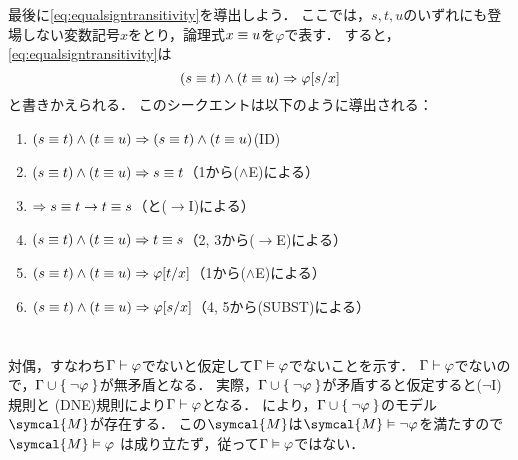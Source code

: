 最後に\cref{eq:equalsigntransitivity}を導出しよう．
ここでは，\(s, t, u\)のいずれにも登場しない変数記号\(x\)をとり，論理式\(x \equiv u\)を\(\varphi\)で表す．
すると，\cref{eq:equalsigntransitivity}は
\begin{equation*}
	\paren{s \objeq t} \land \paren{t \objeq u} \sequent \subst{\varphi}{s/x}
\end{equation*}
と書きかえられる．
このシークエントは以下のように導出される：
\begin{enumerate}
	\item \(\paren{s \objeq t} \land \paren{t \objeq u} \sequent \paren{s \objeq t} \land \paren{t \objeq u}\)\quad (ID)
	\item \(\paren{s \objeq t} \land \paren{t \objeq u} \sequent s \objeq t\)\quad （1から(\(\land\)E)による）
	\item \(\Rightarrow s \equiv t \to t \equiv s\)\quad （と(\(\to\)I)による）
	\item \(\paren{s \objeq t} \land \paren{t \objeq u} \sequent t \objeq s\)\quad （2, 3から(\(\to\)E)による）
	\item \(\paren{s \objeq t} \land \paren{t \objeq u} \sequent \subst{\varphi}{t/x}\)\quad （1から(\(\land\)E)による）
	\item \(\paren{s \objeq t} \land \paren{t \objeq u} \sequent \subst{\varphi}{s/x}\)\quad （4, 5から(SUBST)による）
\end{enumerate}

\section*{}

\subsection*{}

対偶，すなわち\(\Gamma \vdash \varphi\)でないと仮定して\(\Gamma \vDash \varphi\)でないことを示す．
\(\Gamma \vdash \varphi\)でないので，\(\Gamma \cup \Set{\lnot \varphi}\)が無矛盾となる．
実際，\(\Gamma \cup \Set{\lnot \varphi}\)が矛盾すると仮定すると(\(\lnot\)I)規則と
(DNE)規則により\(\Gamma \vdash \varphi\)となる．
により，\(\Gamma \cup \Set{\lnot \varphi}\)のモデル\(\symcal{M}\)が存在する．
この\(\symcal{M}\)は\(\symcal{M} \satisfy \lnot \varphi\)を満たすので\(\symcal{M} \satisfy \varphi\)
は成り立たず，従って\(\Gamma \vDash \varphi\)ではない．

